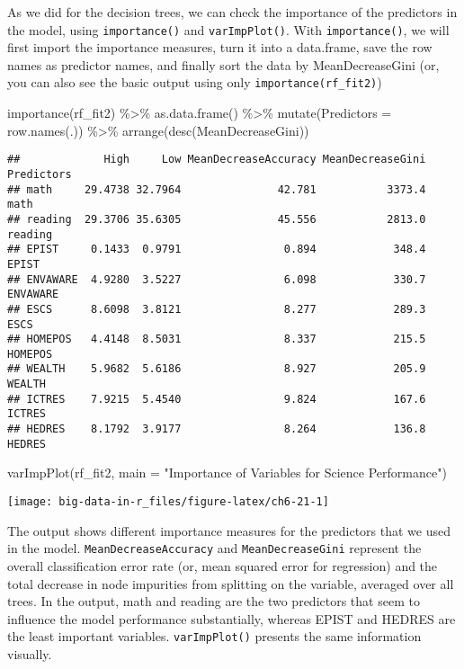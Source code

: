 \documentclass[
]{book}
\newenvironment{Shaded}{\begin{snugshade}}{\end{snugshade}}
\newcommand{\AttributeTok}[1]{\textcolor[rgb]{0.77,0.63,0.00}{#1}}
\newcommand{\FunctionTok}[1]{\textcolor[rgb]{0.00,0.00,0.00}{#1}}
\newcommand{\NormalTok}[1]{#1}
\newcommand{\SpecialCharTok}[1]{\textcolor[rgb]{0.00,0.00,0.00}{#1}}
\newcommand{\StringTok}[1]{\textcolor[rgb]{0.31,0.60,0.02}{#1}}
\begin{document}
As we did for the decision trees, we can check the importance of the predictors in the model, using \texttt{importance()} and \texttt{varImpPlot()}. With \texttt{importance()}, we will first import the importance measures, turn it into a data.frame, save the row names as predictor names, and finally sort the data by MeanDecreaseGini (or, you can also see the basic output using only \texttt{importance(rf\_fit2)})

\begin{Shaded}
\begin{Highlighting}[]
\FunctionTok{importance}\NormalTok{(rf\_fit2) }\SpecialCharTok{\%\textgreater{}\%}
  \FunctionTok{as.data.frame}\NormalTok{() }\SpecialCharTok{\%\textgreater{}\%}
  \FunctionTok{mutate}\NormalTok{(}\AttributeTok{Predictors =} \FunctionTok{row.names}\NormalTok{(.)) }\SpecialCharTok{\%\textgreater{}\%}
  \FunctionTok{arrange}\NormalTok{(}\FunctionTok{desc}\NormalTok{(MeanDecreaseGini))}
\end{Highlighting}
\end{Shaded}

\begin{verbatim}
##             High     Low MeanDecreaseAccuracy MeanDecreaseGini Predictors
## math     29.4738 32.7964               42.781           3373.4       math
## reading  29.3706 35.6305               45.556           2813.0    reading
## EPIST     0.1433  0.9791                0.894            348.4      EPIST
## ENVAWARE  4.9280  3.5227                6.098            330.7   ENVAWARE
## ESCS      8.6098  3.8121                8.277            289.3       ESCS
## HOMEPOS   4.4148  8.5031                8.337            215.5    HOMEPOS
## WEALTH    5.9682  5.6186                8.927            205.9     WEALTH
## ICTRES    7.9215  5.4540                9.824            167.6     ICTRES
## HEDRES    8.1792  3.9177                8.264            136.8     HEDRES
\end{verbatim}

\begin{Shaded}
\begin{Highlighting}[]
\FunctionTok{varImpPlot}\NormalTok{(rf\_fit2, }
           \AttributeTok{main =} \StringTok{"Importance of Variables for Science Performance"}\NormalTok{)}
\end{Highlighting}
\end{Shaded}

\texttt{[image: big-data-in-r\_files/figure-latex/ch6-21-1]}

The output shows different importance measures for the predictors that we used in the model. \texttt{MeanDecreaseAccuracy} and \texttt{MeanDecreaseGini} represent the overall classification error rate (or, mean squared error for regression) and the total decrease in node impurities from splitting on the variable, averaged over all trees. In the output, math and reading are the two predictors that seem to influence the model performance substantially, whereas EPIST and HEDRES are the least important variables. \texttt{varImpPlot()} presents the same information visually.
\end{document}
